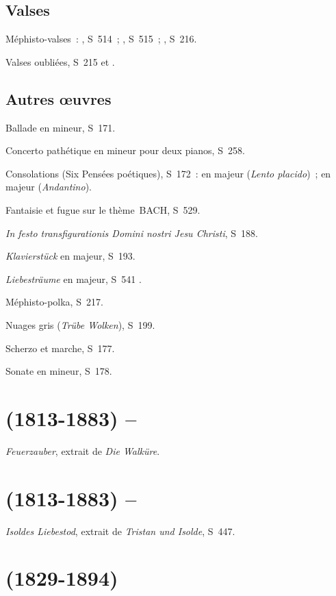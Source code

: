\subsection{Valses}

Méphisto-valses~: , S~514~; , S~515~; ,
S~216.

Valses oubliées, S~215  et .

\subsection{Autres œuvres}

Ballade  en \kB mineur, S~171.

Concerto pathétique en \kE mineur pour deux pianos, S~258.

Consolations (Six Pensées poétiques), S~172~:  en \kD \Flat majeur
(\emph{Lento placido})~;  en \kE majeur (\emph{Andantino}).

Fantaisie et fugue sur le thème~BACH, S~529.

\emph{In festo transfigurationis Domini nostri Jesu Christi}, S~188.

\emph{Klavierstück} en \kF \Sharp majeur, S~193.

\emph{Liebesträume} en \kA \Flat majeur, S~541 .

Méphisto-polka, S~217.

Nuages gris (\emph{Trübe Wolken}), S~199.

Scherzo et marche, S~177.

Sonate en \kB mineur, S~178.

\section[%
Richard Wagner (1813-1883) -- Louis Brassin]{%
\RWagner{} (1813-1883) -- \LBrassin{}}

\emph{Feuerzauber}, extrait de \emph{Die Walküre}.

\section[%
Richard Wagner (1813-1883) -- Ferenc Liszt]{%
\RWagner{} (1813-1883) -- \FLiszt{}}

\emph{Isoldes Liebestod}, extrait de \emph{Tristan und Isolde}, S~447.

\section[%
Anton Rubinštejn (1829-1894)]{%
\ARubinstein{} (1829-1894)}

